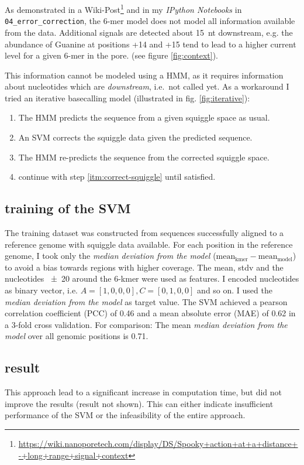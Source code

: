 \documentclass[]{scrartcl}
\begin{document}
As demonstrated in a Wiki-Post\footnote{\url{https://wiki.nanoporetech.com/display/DS/Spooky+action+at+a+distance+-+long+range+signal+context}} and in my \textit{IPython Notebooks} in \texttt{04\_error\_correction}, the 6-mer model does not model all information available from the data. Additional signals are detected about \SI{15}{nt} downstream, e.g. the abundance of Guanine at positions +14 and +15 tend to lead to a higher current level for a given 6-mer in the pore. (see figure \ref{fig:context}).

This information cannot be modeled using a HMM, as it requires information about nucleotides which are \textit{downstream}, i.e.\ not called yet. As a workaround I tried an iterative basecalling model (illustrated in fig. \ref{fig:iterative}): 

\begin{enumerate}
\item The HMM predicts the sequence from a given squiggle space as usual.
\item An SVM corrects the squiggle data given the predicted sequence. \label{itm:correct-squiggle}
\item The HMM re-predicts the sequence from the corrected squiggle space. 
\item continue with step \ref{itm:correct-squiggle} until satisfied. 
\end{enumerate}

\subsection{training of the SVM}
The training dataset was constructed from sequences successfully aligned to a reference genome with squiggle data available. For each position in the reference genome, I took only the \textit{median deviation from the model} ($\mathrm{mean}_\mathrm{kmer} - \mathrm{mean}_\mathrm{model}$) to avoid a bias towards regions with higher coverage. The mean, stdv and the nucleotides \num{+-20} around the 6-kmer were used as features. I encoded nucleotides as binary vector, i.e. $A=[1, 0, 0, 0], C=[0, 1, 0, 0]$ and so on. I used the \textit{median deviation from the model} as target value. The SVM achieved a pearson correlation coefficient (PCC) of 0.46 and a mean absolute error (MAE) of 0.62 in a 3-fold cross validation. For comparison: The mean \textit{median deviation from the model} over all genomic positions is 0.71. 

\subsection{result}
This approach lead to a significant increase in computation time, but did not improve the results (result not shown). This can either indicate insufficient performance of the SVM or the infeasibility of the entire approach. 
\end{document}
